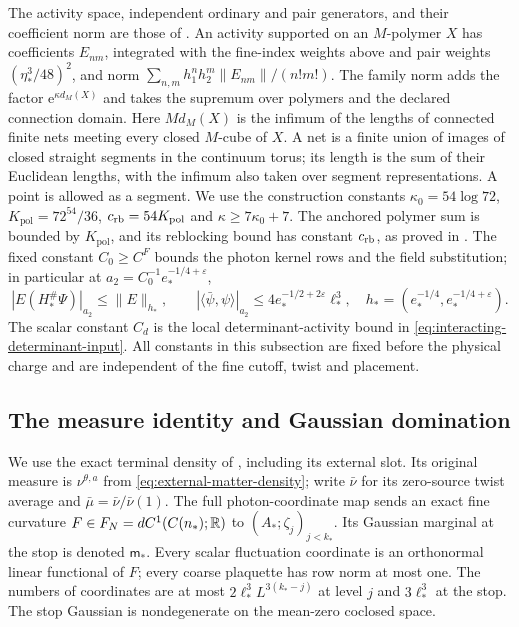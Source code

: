 The activity space, independent ordinary and pair generators, and
their coefficient norm are those of \cite[\S2.2]{NormalizedContraction}.
An activity supported on an $M$-polymer $X$ has coefficients
$E_{nm}$, integrated with the fine-index weights above and pair
weights $(\eta_*^3/48)^2$, and norm
$\sum_{n,m}h_1^nh_2^m\|E_{nm}\|/(n!m!)$.
The family norm adds the factor $\mathrm e^{\kappa d_M(X)}$ and takes
the supremum over polymers and the declared connection domain.
Here $Md_M(X)$ is the infimum of the lengths of connected finite
nets meeting every closed $M$-cube of $X$. A net is a finite union
of images of closed straight segments in the continuum torus;
its length is the sum of their Euclidean lengths, with the infimum
also taken over segment representations. A point is allowed as a
segment. We use the construction constants
$\kappa_0=54\log72$, $K_{\mathrm{pol}}=72^{54}/36$,
$c_{\rm rb}=54K_{\mathrm{pol}}$ and $\kappa\ge7\kappa_0+7$.
The anchored polymer sum is bounded by $K_{\mathrm{pol}}$, and its reblocking
bound has constant $c_{\rm rb}$, as proved in
\cite[Appendix~B, (81) and (83)]{NormalizedContraction}.
The fixed constant $C_0\ge C^F$ bounds the photon kernel rows and
the field substitution; in particular at
$a_2=C_0^{-1}e_*^{-1/4+\varepsilon}$,
\[
 |E(H_*^\#\Psi)|_{a_2}\le\|E\|_{h_*},\qquad
 |\langle\bar\psi,\psi\rangle|_{a_2}
          \le4e_*^{-1/2+2\varepsilon}\ell_*^3,
 \quad h_*=(e_*^{-1/4},e_*^{-1/4+\varepsilon}).
\]
The scalar constant $C_d$ is the local determinant-activity bound
in \eqref{eq:interacting-determinant-input}.
All constants in this subsection are fixed before the physical charge
and are independent of the fine cutoff, twist and placement.

\subsection{The measure identity and Gaussian domination}
We use the exact terminal density of
\cite[Theorem~B]{TerminalPressure}, including its external slot.
Its original measure is $\nu^{\theta,a}$ from
\eqref{eq:external-matter-density}; write $\bar\nu$ for its
zero-source twist average and $\bar\mu=\bar\nu/\bar\nu(1)$.
The full photon-coordinate map sends an exact fine curvature
$F\in F_N=dC^1(C(n_*);\mathbb R)$ to $(A_*;\zeta_j)_{j<k_*}$.
Its Gaussian marginal at the stop is denoted $\mathsf m_*$.
Every scalar fluctuation coordinate is an orthonormal linear
functional of $F$; every coarse plaquette has row norm at most one.
The numbers of coordinates are at most
$2\ell_*^3L^{3(k_*-j)}$ at level $j$ and $3\ell_*^3$ at the stop.
The stop Gaussian is nondegenerate on the mean-zero coclosed space.

